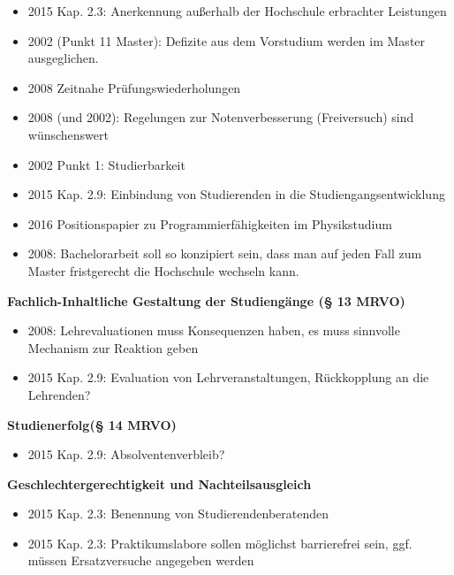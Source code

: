 \begin{itemize}
        \item 2015 Kap. 2.3: Anerkennung außerhalb der Hochschule erbrachter Leistungen
        \item 2002 (Punkt 11 Master): Defizite aus dem Vorstudium werden im Master ausgeglichen.
        \item 2008 Zeitnahe Prüfungswiederholungen
        \item 2008 (und 2002): Regelungen zur Notenverbesserung (Freiversuch) sind wünschenswert
        \item 2002 Punkt 1: Studierbarkeit
        \item 2015 Kap. 2.9: Einbindung von Studierenden in die Studiengangsentwicklung
        \item 2016 Positionspapier zu Programmierfähigkeiten im Physikstudium
        \item 2008: Bachelorarbeit soll so konzipiert sein, dass man auf jeden Fall zum Master fristgerecht die Hochschule wechseln kann.
      \end{itemize}


    \textbf{Fachlich-Inhaltliche Gestaltung der Studiengänge (§ 13 MRVO)}
      \begin{itemize}
        \item 2008: Lehrevaluationen muss Konsequenzen haben, es muss sinnvolle Mechanism zur Reaktion geben
        \item 2015 Kap. 2.9: Evaluation von Lehrveranstaltungen, Rückkopplung an die Lehrenden?
      \end{itemize}

    \textbf{Studienerfolg(§ 14 MRVO)}
      \begin{itemize}
        \item 2015 Kap. 2.9: Absolventenverbleib?
      \end{itemize}

    \textbf{Geschlechtergerechtigkeit und Nachteilsausgleich}
      \begin{itemize}
        \item 2015 Kap. 2.3: Benennung von Studierendenberatenden
        \item 2015 Kap. 2.3: Praktikumslabore sollen möglichst barrierefrei sein, ggf. müssen Ersatzversuche angegeben werden
      \end{itemize}

